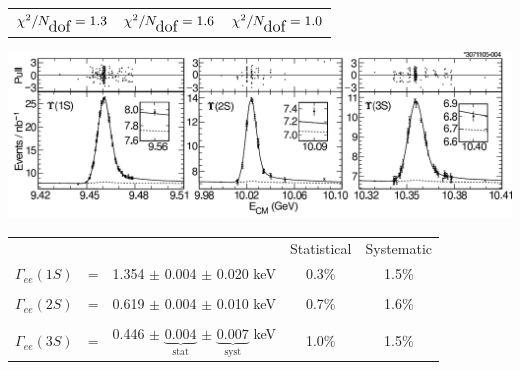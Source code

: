 \documentclass[landscape]{article}
\newcommand{\subs}[1]{{\mbox{\large #1}}}
\begin{document}
\begin{slide:fitting}

\begin{center}

{\Large \boldmath
\hspace{0.5 cm} \begin{tabular}{c c c}
  $\chi^2/N_\subs{dof} = 1.3$ \mbox{\hspace{4.2 cm}} & $\chi^2/N_\subs{dof} = 1.6$ & \mbox{\hspace{4.2 cm}} $\chi^2/N_\subs{dof} = 1.0$
\end{tabular}}
\includegraphics[width=\linewidth]{plots/fits}

\vfill
\renewcommand{\arraystretch}{1.2}
\begin{tabular}{c c c c c}
  & & & Statistical & Systematic \\
  \boldmath $\Gamma_{ee}(1S)$ & \mbox{\hspace{0.25 cm}} = \mbox{\hspace{0.25 cm}} & 1.354 $\pm$ 0.004 $\pm$ 0.020 keV & 0.3\% & 1.5\% \\
  & & & \\
  \boldmath $\Gamma_{ee}(2S)$ & = & 0.619 $\pm$ 0.004 $\pm$ 0.010 keV & 0.7\% & 1.6\% \\
  & & & \\
  \boldmath $\Gamma_{ee}(3S)$ & = & 0.446 $\pm$ $\underbrace{\mbox{0.004}}_{\mbox{stat}}$ $\pm$ $\underbrace{\mbox{0.007}}_{\mbox{syst}}$ keV & 1.0\% & 1.5\%
\end{tabular}

\end{center}

\end{slide:fitting}
\end{document}
